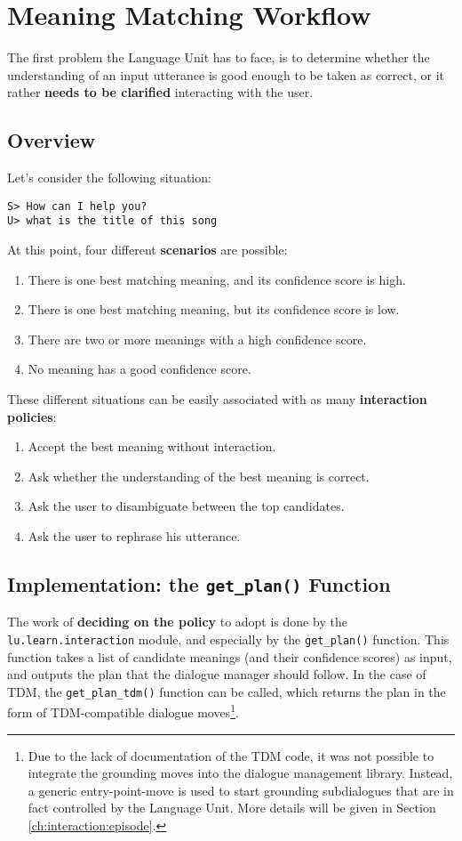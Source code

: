 \section{Meaning Matching Workflow} \label{ch:interaction:mmw}
The first problem the Language Unit has to face, is to determine whether the understanding of an input utterance is good enough to be taken as correct, or it rather \textbf{needs to be clarified} interacting with the user.

\subsection{Overview}
Let's consider the following situation:

\texttt{S> How can I help you? \\
U> what is the title of this song}

At this point, four different \textbf{scenarios} are possible:
\begin{enumerate}
	\item There is one best matching meaning, and its confidence score is high.
	\item There is one best matching meaning, but its confidence score is low.
	\item There are two or more meanings with a high confidence score.
	\item No meaning has a good confidence score.
\end{enumerate}
These different situations can be easily associated with as many \textbf{interaction policies}:
\begin{enumerate}
	\item Accept the best meaning without interaction.
	\item Ask whether the understanding of the best meaning is correct.
	\item Ask the user to disambiguate between the top candidates.
	\item Ask the user to rephrase his utterance.
\end{enumerate}

\subsection{Implementation: the \texttt{get\_plan()} Function} \label{ch:interaction:mmw:getplan}
The work of \textbf{deciding on the policy} to adopt is done by the \texttt{lu.learn.interaction} module, and especially by the \texttt{get\_plan()} function. This function takes a list of candidate meanings (and their confidence scores) as input, and outputs the plan that the dialogue manager should follow. In the case of TDM, the \texttt{get\_plan\_tdm()} function can be called, which returns the plan in the form of TDM-compatible dialogue moves\footnote{Due to the lack of documentation of the TDM code, it was not possible to integrate the grounding moves into the dialogue management library. Instead, a generic entry-point-move is used to start grounding subdialogues that are in fact controlled by the Language Unit. More details will be given in Section \ref{ch:interaction:episode}.}.

